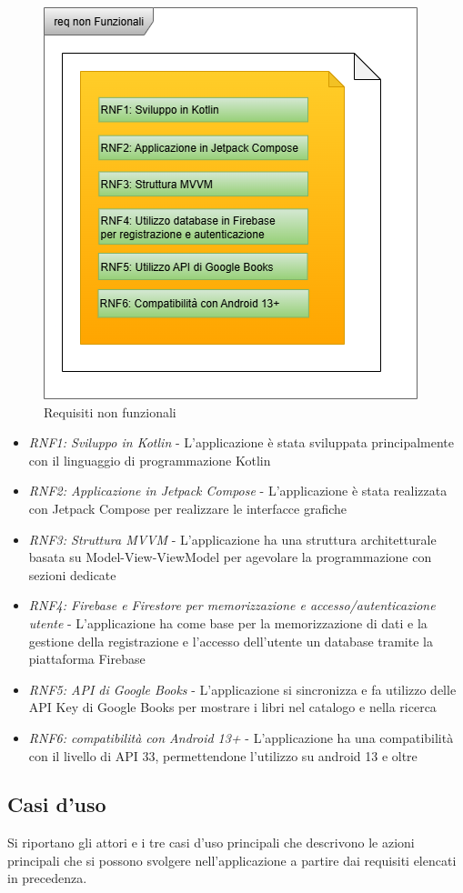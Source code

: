 \documentclass{article}
\begin{document}
\begin{figure}[H]
  \centering
  \includegraphics[width=.6\linewidth]{req_non_funzionali.png}
  \caption{Requisiti non funzionali}
  \label{fig:sitemap}
\end{figure}

\begin{itemize}[label=\textendash]
    \item \textit{RNF1: Sviluppo in Kotlin} - L'applicazione è stata sviluppata principalmente con il linguaggio di programmazione Kotlin
    \item \textit{RNF2: Applicazione in Jetpack Compose} - L'applicazione è stata realizzata con Jetpack Compose per realizzare le interfacce grafiche
    \item \textit{RNF3: Struttura MVVM} - L'applicazione ha una struttura architetturale basata su Model-View-ViewModel per agevolare la programmazione con sezioni dedicate
    \item \textit{RNF4: Firebase e Firestore per memorizzazione e accesso/autenticazione utente} - L'applicazione ha come base per la memorizzazione di dati e la gestione della registrazione e l'accesso dell'utente un database tramite la piattaforma Firebase
    \item \textit{RNF5: API di Google Books} - L'applicazione si sincronizza e fa utilizzo delle API Key di Google Books per mostrare i libri nel catalogo e nella ricerca
    \item \textit{RNF6: compatibilità con Android 13+} - L'applicazione ha una compatibilità con il livello di API 33, permettendone l'utilizzo su android 13 e oltre
\end{itemize}

\subsection{Casi d'uso}
Si riportano gli attori e i tre casi d'uso principali che descrivono le azioni principali che si possono svolgere nell'applicazione a partire dai requisiti elencati in precedenza.
\end{document}
